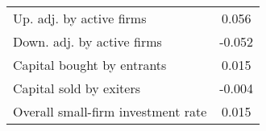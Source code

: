  \begin{tabular}{lc} \hline \hline 
Up. adj. by active firms &    0.056 \\ 
Down. adj. by active firms &   -0.052 \\ 
Capital bought by entrants &    0.015 \\ 
Capital sold by exiters &   -0.004 \\ 
Overall small-firm investment rate &    0.015 \\ 
\hline \hline 
 \end{tabular} 
